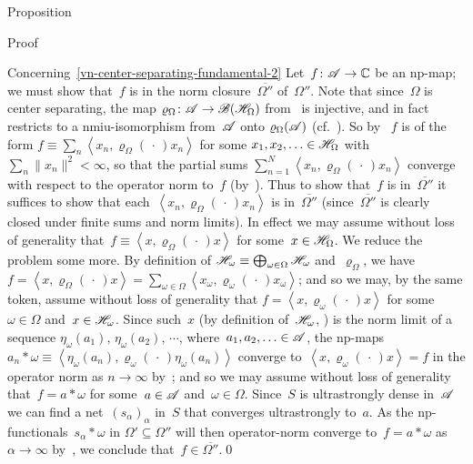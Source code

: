 \documentclass[a]{subfiles}
\begin{document}
\begin{parsec}
\begin{point}{Proposition}
\begin{point}{Proof}
\begin{point}{Concerning~\ref{vn-center-separating-fundamental-2}}%
Let~$f\colon \mathscr{A}\to\mathbb{C}$ be an np-map;
we must show that~$f$ is in 
the norm closure~$\overline{\Omega''}$ of~$\Omega''$.
Note that since~$\Omega$ is center separating,
the map $\varrho_\Omega\colon \mathscr{A}\to\mathscr{B}(\mathscr{H}_\Omega)$
from~
is injective,
and in fact restricts
to a nmiu-isomorphism
from~$\mathscr{A}$ onto $\varrho_\Omega(\mathscr{A})$
(cf.~).
So by~
$f$ is of the form $f\equiv 
\sum_n \left<x_n,\varrho_\Omega(\,\cdot\,)x_n\right>$
for some $x_1,x_2,\dotsc \in\mathscr{H}_\Omega$
with $\sum_n \|x_n\|^2<\infty$,
so that the partial sums
$\sum_{n=1}^N \left<x_n,\varrho_\Omega(\,\cdot\,)x_n\right>$
converge with respect to the operator norm to~$f$
(by~).
Thus to show that~$f$ is in~$\overline{\Omega''}$
it suffices to show that each~$\left<x_n,\varrho_\Omega(\,\cdot\,)x_n\right>$
is in~$\overline{\Omega''}$
(since~$\overline{\Omega''}$ is clearly closed
under finite sums and norm limits).
In effect
we may assume 
without loss of generality
that~$f\equiv \left<x,\varrho_\Omega(\,\cdot\,)x\right>$
for some~$x\in \mathscr{H}_\Omega$.
We reduce the problem some more.
By definition 
of $\mathscr{H}_\omega\equiv \bigoplus_{\omega\in\Omega}\mathscr{H}_\omega$
and~$\varrho_\Omega$,
we have $f=\left<x,\varrho_\Omega(\,\cdot\,)x\right>
= \sum_{\omega\in \Omega} 
\left<x_\omega,\varrho_\omega(\,\cdot\,)x_\omega\right>$;
and so we may, by the same token, assume without loss of generality
that $f=\left<x,\varrho_\omega(\,\cdot\,)x\right>$
for some~$\omega\in \Omega$
and~$x\in \mathscr{H}_\omega$.
Since such~$x$ (by definition of~$\mathscr{H}_\omega$, 
)
is the norm limit of
a sequence $\eta_\omega(a_1),\,\eta_\omega(a_2),\,
\dotsb$,
where~$a_1,a_2,\dotsc\in\mathscr{A}$,
the np-maps $a_n\ast \omega\equiv 
\left<\eta_\omega(a_n),\varrho_\omega(\,\cdot\,)\eta_\omega(a_n)\right>$
converge to~$\left<x,\varrho_\omega(\,\cdot\,) x\right>=f$
in the operator norm as $n\to\infty$ by~;
and so we may assume without loss of generality
that~$f=a\ast \omega$ for some~$a\in\mathscr{A}$ and~$\omega\in \Omega$.
Since~$S$ is ultrastrongly dense in~$\mathscr{A}$
we can find a net~$(s_\alpha)_\alpha$
in~$S$ that converges ultrastrongly to~$a$.
As the np-functionals~$s_\alpha \ast \omega$
in $\Omega'\subseteq \Omega''$
will then
operator-norm converge
to~$f= a\ast \omega$
as $\alpha\to\infty$
by~,
we conclude that~$f\in \overline{\Omega''}$.\qed
\end{point}
\end{point}
\end{point}
\end{parsec}
\end{document}
